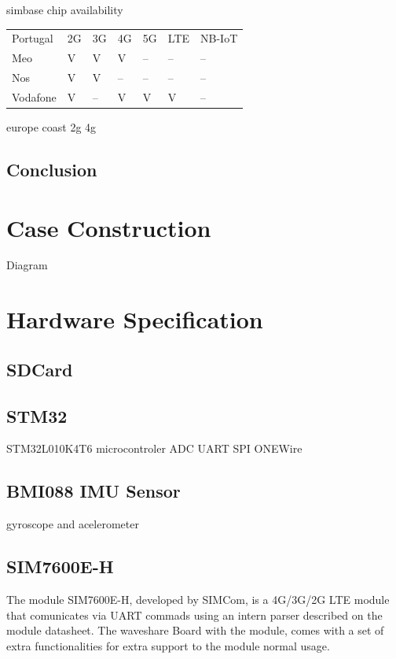 simbase chip availability

\begin{table}
    \centering
    \begin{tabular}{lllllll}
    Portugal & 2G & 3G & 4G & 5G & LTE & NB-IoT   \\
    Meo      & V  & V  & V  & -- & --  & --       \\
    Nos      & V  & V  & -- & -- & --  & --       \\
    Vodafone & V  & -- & V  & V  & V   & -- 
    \end{tabular}
\end{table}

europe coast
2g 4g


\subsection{Conclusion}
\section{Case Construction}

Diagram

\section{Hardware Specification}
\subsection{SDCard}
\subsection{STM32}

STM32L010K4T6
microcontroler
ADC
UART
SPI
ONEWire
\subsection{BMI088 IMU Sensor}
gyroscope and acelerometer
\subsection{SIM7600E-H} 
The module SIM7600E-H, developed by SIMCom, is a 4G/3G/2G LTE module that comunicates via UART commads using an intern parser described on the module datasheet. 
The waveshare Board with the module, comes with a set of extra functionalities for extra support to the module normal usage.


